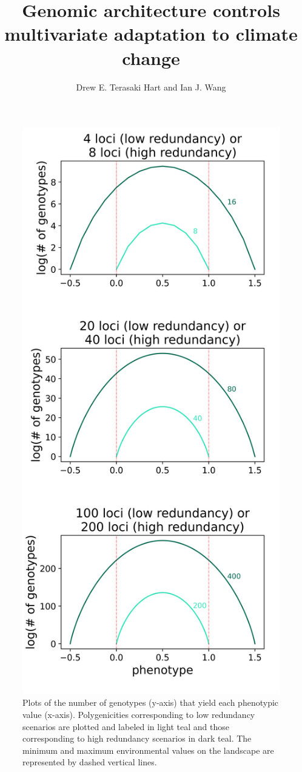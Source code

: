 \documentclass[9pt,twoside,lineno]{new_article}
\title{Genomic architecture controls multivariate adaptation to climate change}
\author{Drew E. Terasaki Hart and Ian J. Wang}
\begin{document}
\maketitle




\begin{figure}
\centering
\includegraphics[width=.5\linewidth]{pub/figs_and_stats/FIG_S1_redundancy.png}
\caption{Plots of the number of genotypes (y-axis) that yield each phenotypic value (x-axis). Polygenicities corresponding to low redundancy scenarios are plotted and labeled in light teal and those corresponding to high redundancy scenarios in dark teal. The minimum and maximum environmental values on the landscape are represented by dashed vertical lines.
}
\label{fig:fig_s1}
\end{figure}
\end{document}
